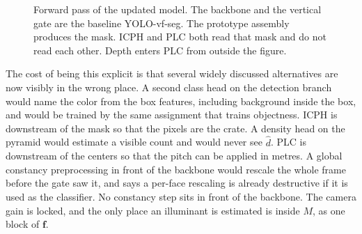 \begin{figure}[t]
\centering
{}
\caption{Forward pass of the updated model. The backbone and the vertical gate are the baseline YOLO-vf-seg. The prototype assembly produces the mask. ICPH and PLC both read that mask and do not read each other. Depth enters PLC from outside the figure.}
\label{fig:forward}
\end{figure}

The cost of being this explicit is that several widely discussed alternatives are now visibly in the wrong place. A second class head on the detection branch would name the color from the box features, including background inside the box, and would be trained by the same assignment that trains objectness. ICPH is downstream of the mask so that the pixels are the crate. A density head on the pyramid would estimate a visible count and would never see $\hat d$. PLC is downstream of the centers so that the pitch can be applied in metres. A global constancy preprocessing in front of the backbone would rescale the whole frame before the gate saw it, and  says a per-face rescaling is already destructive if it is used as the classifier. No constancy step sits in front of the backbone. The camera gain is locked, and the only place an illuminant is estimated is inside $M$, as one block of $\mathbf{f}$.

